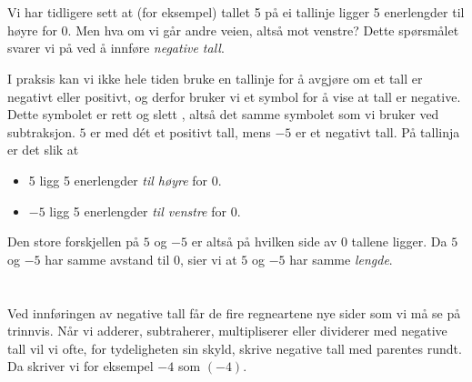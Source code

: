 




\section{\negintro}
Vi har tidligere sett at (for eksempel) tallet 5 på ei tallinje ligger 5 enerlengder til høyre for 0. 
Men hva om vi går andre veien, altså mot venstre? Dette spørsmålet svarer vi på ved å innføre \textit{negative tall}.\regv

\vsk 
I praksis kan vi ikke hele tiden bruke en tallinje for å avgjøre om et tall er negativt eller positivt, og derfor bruker vi et symbol for å vise at tall er negative. Dette symbolet er rett og slett \sym{$ - $}, altså det samme symbolet som vi bruker ved subtraksjon. $ 5 $ er med dét et positivt tall, mens $ -5 $ er et negativt tall. På tallinja er det slik at
\begin{itemize}
	\item 5 ligg 5 enerlengder \textsl{til høyre} for 0.
	\item $ -5 $ ligg 5 enerlengder \textsl{til venstre} for 0.
\end{itemize}
Den store forskjellen på $ 5 $ og $ -5 $ er altså på hvilken side av 0 tallene ligger. Da $ 5 $ og $ -5 $ har samme avstand til 0, sier vi at $ 5 $ og $ -5 $ har samme \textit{lengde}. \regv

\eks[1]{ \vs \vs
\[ |27|=27 \]
}
\eks[2]{ \vs \vs
\[ |-27|=27 \]
}
\newpage
\section{\negrekn \label{rekmneg}}
Ved innføringen av negative tall får de fire regneartene nye sider som vi må se på trinnvis. Når vi adderer, subtraherer, multipliserer eller dividerer med negative tall vil vi ofte, for tydeligheten sin skyld, skrive negative tall med parentes rundt. Da skriver vi for eksempel $ -4 $ som $ (-4) $. 

